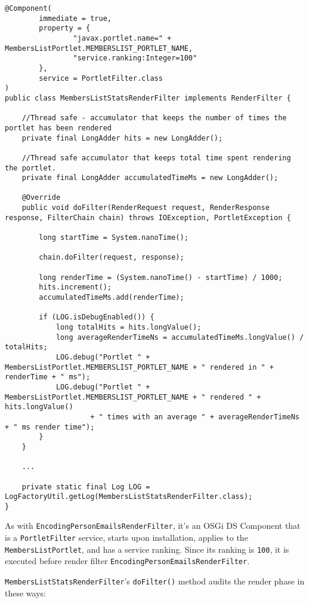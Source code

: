 \begin{verbatim}
@Component(
        immediate = true,
        property = {
                "javax.portlet.name=" + MembersListPortlet.MEMBERSLIST_PORTLET_NAME,
                "service.ranking:Integer=100"
        },
        service = PortletFilter.class
)
public class MembersListStatsRenderFilter implements RenderFilter {

    //Thread safe - accumulator that keeps the number of times the portlet has been rendered
    private final LongAdder hits = new LongAdder();

    //Thread safe accumulator that keeps total time spent rendering the portlet.
    private final LongAdder accumulatedTimeMs = new LongAdder();

    @Override
    public void doFilter(RenderRequest request, RenderResponse response, FilterChain chain) throws IOException, PortletException {

        long startTime = System.nanoTime();

        chain.doFilter(request, response);

        long renderTime = (System.nanoTime() - startTime) / 1000;
        hits.increment();
        accumulatedTimeMs.add(renderTime);

        if (LOG.isDebugEnabled()) {
            long totalHits = hits.longValue();
            long averageRenderTimeNs = accumulatedTimeMs.longValue() / totalHits;
            LOG.debug("Portlet " + MembersListPortlet.MEMBERSLIST_PORTLET_NAME + " rendered in " + renderTime + " ms");
            LOG.debug("Portlet " + MembersListPortlet.MEMBERSLIST_PORTLET_NAME + " rendered " + hits.longValue()
                    + " times with an average " + averageRenderTimeNs + " ms render time");
        }
    }

    ...

    private static final Log LOG = LogFactoryUtil.getLog(MembersListStatsRenderFilter.class);
}
\end{verbatim}

As with \texttt{EncodingPersonEmailsRenderFilter}, it's an OSGi DS
Component that is a \texttt{PortletFilter} service, starts upon
installation, applies to the \texttt{MembersListPortlet}, and has a
service ranking. Since its ranking is \texttt{100}, it is executed
before render filter \texttt{EncodingPersonEmailsRenderFilter}.

\texttt{MembersListStatsRenderFilter}'s \texttt{doFilter()} method
audits the render phase in these ways:

